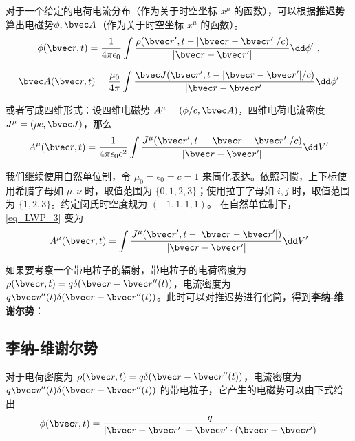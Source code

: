 

对于一个给定的电荷电流分布（作为关于时空坐标 $x^\mu$ 的函数），可以根据\textbf{推迟势}算出电磁势$\phi,\bvec A$（作为关于时空坐标 $x^\mu$ 的函数）。
\begin{equation}
\phi(\bvec r,t)=\frac{1}{4\pi\epsilon_0}\int \frac{\rho(\bvec r',t-|\bvec r-\bvec r'|/c)}{|\bvec r-\bvec r'|}\dd \phi'~,
\end{equation}

\begin{equation}
\bvec A(\bvec r,t)=\frac{\mu_0}{4\pi}\int \frac{\bvec J(\bvec r',t-|\bvec r-\bvec r'|/c)}{|\bvec r-\bvec r'|}\dd \phi'
\end{equation}

或者写成四维形式：设四维电磁势 $A^\mu=(\phi/c,\bvec A)$，四维电荷电流密度 $J^\mu=(\rho c,\bvec J)$，那么
\begin{equation}\label{eq_LWP_3}
A^\mu(\bvec r,t)=\frac{1}{4\pi\epsilon_0c^2}\int \frac{J^\mu(\bvec r',t-|\bvec r-\bvec r'|/c)}{|\bvec r-\bvec r'|}\dd V'
\end{equation}

我们继续使用自然单位制，令 $\mu_0=\epsilon_0=c=1$ 来简化表达。依照习惯，上下标使用希腊字母如 $\mu, \nu$ 时，取值范围为 $\{0, 1, 2, 3\}$；使用拉丁字母如 $i, j$ 时，取值范围为 $\{1, 2, 3\}$。约定闵氏时空度规为 $(-1,1,1,1)$。
在自然单位制下，\autoref{eq_LWP_3} 变为
\begin{equation}\label{eq_LWP_4}
A^\mu(\bvec r,t)=\int \frac{J^\mu(\bvec r',t-|\bvec r-\bvec r'|)}{|\bvec r-\bvec r'|}\dd V'
\end{equation}

如果要考察一个带电粒子的辐射，带电粒子的电荷密度为 $\rho(\bvec r,t)=q\delta(\bvec r-\bvec r''(t))$，电流密度为 $q\bvec v''(t) \delta(\bvec r-\bvec r''(t))$。此时可以对推迟势进行化简，得到\textbf{李纳-维谢尔势}：
\subsection{李纳-维谢尔势}

对于电荷密度为 $\rho(\bvec r,t)=q\delta(\bvec r-\bvec r''(t))$，电流密度为 $q\bvec v''(t) \delta(\bvec r-\bvec r''(t))$ 的带电粒子，它产生的电磁势可以由下式给出
\begin{equation}\label{eq_LWP_1}
\phi(\bvec r,t)=\frac{q}{|\bvec r-\bvec r'|-\bvec v'\cdot (\bvec r-\bvec r')}
\end{equation}

